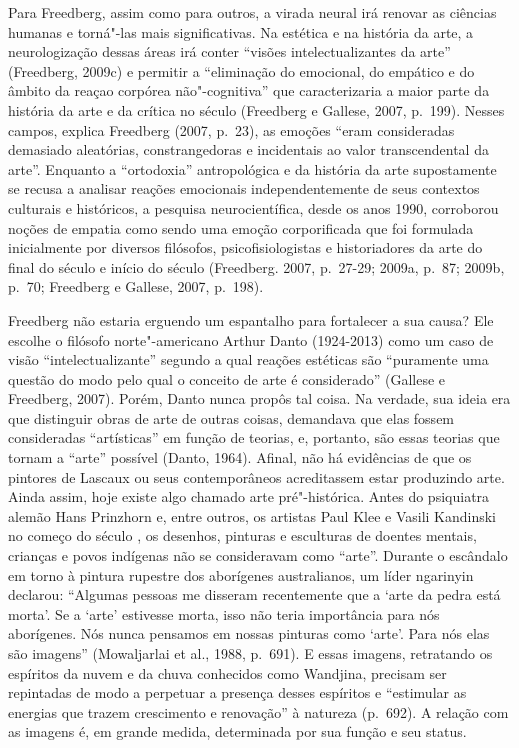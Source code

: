 Para Freedberg, assim como para outros, a virada neural irá renovar as
ciências humanas e torná"-las mais significativas. Na estética e na
história da arte, a neurologização dessas áreas irá conter ``visões
intelectualizantes da arte'' (Freedberg, 2009c) e permitir a
``eliminação do emocional, do empático e do âmbito da reaçao corpórea
não"-cognitiva'' que caracterizaria a maior parte da história da arte e
da crítica no século  (Freedberg e Gallese, 2007, p.~199). Nesses
campos, explica Freedberg (2007, p.~23), as emoções ``eram consideradas
demasiado aleatórias, constrangedoras e incidentais ao valor
transcendental da arte''. Enquanto a ``ortodoxia'' antropológica e da
história da arte supostamente se recusa a analisar reações emocionais
independentemente de seus contextos culturais e históricos, a pesquisa
neurocientífica, desde os anos 1990, corroborou noções de empatia como
sendo uma emoção corporificada que foi formulada inicialmente por
diversos filósofos, psicofisiologistas e historiadores da arte do final
do século  e início do século  (Freedberg. 2007, p.~27-29; 2009a,
p.~87; 2009b, p.~70; Freedberg e Gallese, 2007, p.~198).

Freedberg não estaria erguendo um espantalho para fortalecer a sua
causa? Ele escolhe o filósofo norte"-americano Arthur Danto (1924-2013)
como um caso de visão ``intelectualizante'' segundo a qual reações
estéticas são ``puramente uma questão do modo pelo qual o conceito de
arte é considerado'' (Gallese e Freedberg, 2007). Porém, Danto nunca
propôs tal coisa. Na verdade, sua ideia era que distinguir obras de arte
de outras coisas, demandava que elas fossem consideradas ``artísticas''
em função de teorias, e, portanto, são essas teorias que tornam a
``arte'' possível (Danto, 1964). Afinal, não há evidências de que os
pintores de Lascaux ou seus contemporâneos acreditassem estar produzindo
arte. Ainda assim, hoje existe algo chamado arte pré"-histórica. Antes do
psiquiatra alemão Hans Prinzhorn e, entre outros, os artistas Paul Klee
e Vasili Kandinski no começo do século , os desenhos, pinturas e
esculturas de doentes mentais, crianças e povos indígenas não se
consideravam como ``arte''. Durante o escândalo em torno à pintura
rupestre dos aborígenes australianos, um líder ngarinyin declarou:
``Algumas pessoas me disseram recentemente que a `arte da pedra está
morta'. Se a `arte' estivesse morta, isso não teria importância para nós
aborígenes. Nós nunca pensamos em nossas pinturas como `arte'. Para nós
elas são imagens'' (Mowaljarlai et al., 1988, p.~691). E essas imagens,
retratando os espíritos da nuvem e da chuva conhecidos como Wandjina,
precisam ser repintadas de modo a perpetuar a presença desses espíritos
e ``estimular as energias que trazem crescimento e renovação'' à
natureza (p.~692). A relação com as imagens é, em grande medida,
determinada por sua função e seu status.

